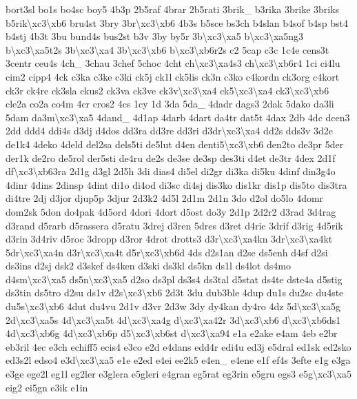 {bort3sl bo1s bo4sc boy5 4b3p 2b5raf 4brar 2b5rati 3brik\-\_\- b3rika 3brike 3briks b5rik\textbackslash{}xc3\textbackslash{}xb6 bru4st 3bry 3br\textbackslash{}xc3\textbackslash{}xb6 4b3s b5sce bs3ch b4slan b4sof b4sp bst4 b4stj 4b3t 3bu bund4s bus2st b3v 3by by5r 3b\textbackslash{}xc3\textbackslash{}xa5 b\textbackslash{}xc3\textbackslash{}xa5ng3 b\textbackslash{}xc3\textbackslash{}xa5t2s 3b\textbackslash{}xc3\textbackslash{}xa4 3b\textbackslash{}xc3\textbackslash{}xb6 b\textbackslash{}xc3\textbackslash{}xb6r2s c2 5cap c3c 1c4e cens3t 3centr ceu4s 4ch\-\_\- 3chau 3chef 5choc 4cht ch\textbackslash{}xc3\textbackslash{}xa4s3 ch\textbackslash{}xc3\textbackslash{}xb6r4 1ci ci4lu cim2 cipp4 4ck c3ka c3ke c3ki ck5j ck1l ck5lis ck3n c3ko c4kordn ck3org c4kort ck3r ck4re ck3sla ckus2 ck3va ck3ve ck3v\textbackslash{}xc3\textbackslash{}xa4 ck5\textbackslash{}xc3\textbackslash{}xa4 ck3\textbackslash{}xc3\textbackslash{}xb6 cle2a co2a co4m 4cr cros2 4cs 1cy 1d 3da 5da\-\_\- 4dadr dags3 2dak 5dako da3li 5dam da3m\textbackslash{}xc3\textbackslash{}xa5 4dand\-\_\- 4d1ap 4darb 4dart da4tr dat5t 4dax 2db 4dc dcen3 2dd ddd4 ddi4s d3dj d4dos dd3ra dd3re dd3ri d3dr\textbackslash{}xc3\textbackslash{}xa4 dd2s dds3v 3d2e de1k4 4deko 4deld del2sa dels5ti de5lut d4en denti5\textbackslash{}xc3\textbackslash{}xb6 den2to de3pr 5der der1k de2ro de5rol der5sti de4ru de2s de3se de3sp des3ti d4et de3tr 4dex 2d1f df\textbackslash{}xc3\textbackslash{}xb63ra 2d1g d3gl 2d5h 3di dias4 di5el di2gr di3ka di5ku 4dinf din3g4o 4dinr 4dins 2dinsp 4dint di1o di4od di3sc di4sj dis3ko dis1kr dis1p dis5to dis3tra di4tre 2dj d3jor djup5p 3djur 2d3k2 4d5l 2d1m 2d1n 3do d2ol do5lo 4domr dom2sk 5don do4pak 4d5ord 4dori 4dort d5ost do3y 2d1p 2d2r2 d3rad 3d4rag d3rand d5rarb d5rassera d5ratu 3drej d3ren 5dres d3ret d4ric 3drif d3rig 4d5rik d3rin 3d4riv d5roc 3dropp d3ror 4drot drotts3 d3r\textbackslash{}xc3\textbackslash{}xa4kn 3dr\textbackslash{}xc3\textbackslash{}xa4kt 5dr\textbackslash{}xc3\textbackslash{}xa4n d3r\textbackslash{}xc3\textbackslash{}xa4t d5r\textbackslash{}xc3\textbackslash{}xb6d 4ds d2s1an d2se ds5enh d4sf d2si ds3ins d2sj dsk2 d3skef ds4ken d3ski ds3kl ds5kn ds1l ds4lot ds4mo d4sm\textbackslash{}xc3\textbackslash{}xa5 ds5n\textbackslash{}xc3\textbackslash{}xa5 d2so ds3pl ds3s4 ds3tal d5stat ds4te dste4a d5stig ds3tin ds5tro d2su ds1v d2s\textbackslash{}xc3\textbackslash{}xb6 2d3t 3du dub3ble 4dup du1s du2sc du4ste du5s\textbackslash{}xc3\textbackslash{}xb6 4dut du4vu 2d1v d3vr 2d3w 3dy dy4kan dy4ro 4dz 5d\textbackslash{}xc3\textbackslash{}xa5g 2d\textbackslash{}xc3\textbackslash{}xa5s 4d\textbackslash{}xc3\textbackslash{}xa5t 4d\textbackslash{}xc3\textbackslash{}xa4g d\textbackslash{}xc3\textbackslash{}xa42r 3d\textbackslash{}xc3\textbackslash{}xb6 d\textbackslash{}xc3\textbackslash{}xb6ds1 4d\textbackslash{}xc3\textbackslash{}xb6g 4d\textbackslash{}xc3\textbackslash{}xb6p d5\textbackslash{}xc3\textbackslash{}xb6st d\textbackslash{}xc3\textbackslash{}xa94 e1a e2ake e4am 4eb e2br eb3ril 4ec e3ch echiff5 ecis4 e3co e2d e4dans edd4r edi4u ed3j e5dral ed1sk ed2sko ed3s2l edso4 e3d\textbackslash{}xc3\textbackslash{}xa5 e1e e2ed e4ei ee2k5 e4en\-\_\- e4ene e1f ef4s 3efte e1g e3ga e3ge ege2l eg1l eg2ler e3glera e5gleri e4gran eg5rat eg3rin e5gru egs3 e5g\textbackslash{}xc3\textbackslash{}xa5 eig2 ei5gn e3ik e1in }
